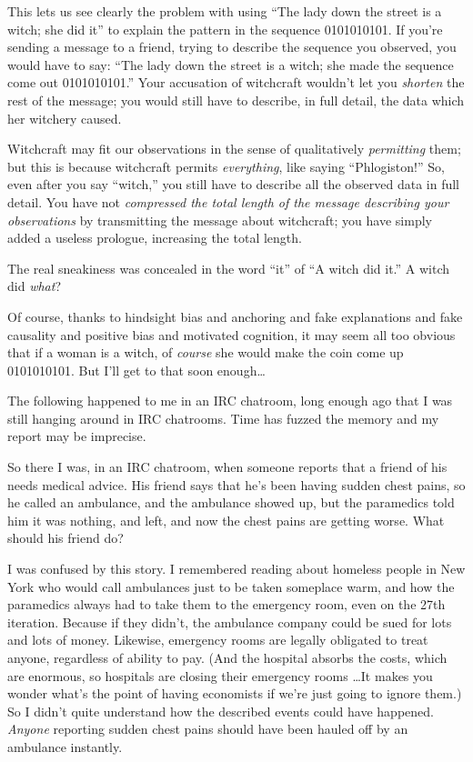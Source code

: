 {
 This lets us see clearly the problem with using
``The lady down the street is a witch; she did
it'' to explain the pattern in the sequence
0101010101. If you're sending a message to a friend,
trying to describe the sequence you observed, you would have to say:
``The lady down the street is a witch; she made the
sequence come out 0101010101.'' Your accusation of
witchcraft wouldn't let you \textit{shorten} the rest
of the message; you would still have to describe, in full detail, the
data which her witchery caused.}

{
 Witchcraft may fit our observations in the sense of qualitatively
\textit{permitting} them; but this is because witchcraft permits
\textit{everything}, like saying
``Phlogiston!'' So, even after you
say ``witch,'' you still have to
describe all the observed data in full detail. You have not
\textit{compressed the total length of the message describing your
observations} by transmitting the message about witchcraft; you have
simply added a useless prologue, increasing the total length.}

{
 The real sneakiness was concealed in the word
``it'' of ``A witch
did it.'' A witch did \textit{what}?}

{
 Of course, thanks to hindsight bias and anchoring and fake
explanations and fake causality and positive bias and motivated
cognition, it may seem all too obvious that if a woman is a witch, of
\textit{course} she would make the coin come up 0101010101. But
I'll get to that soon enough\ldots}

\myendsectiontext


{
 The following happened to me in an IRC chatroom, long enough ago
that I was still hanging around in IRC chatrooms. Time has fuzzed the
memory and my report may be imprecise. }

{
 So there I was, in an IRC chatroom, when someone reports that a
friend of his needs medical advice. His friend says that
he's been having sudden chest pains, so he called an
ambulance, and the ambulance showed up, but the paramedics told him it
was nothing, and left, and now the chest pains are getting worse. What
should his friend do?}

{
 I was confused by this story. I remembered reading about homeless
people in New York who would call ambulances just to be taken someplace
warm, and how the paramedics always had to take them to the emergency
room, even on the 27th iteration. Because if they
didn't, the ambulance company could be sued for lots
and lots of money. Likewise, emergency rooms are legally obligated to
treat anyone, regardless of ability to pay. (And the hospital absorbs
the costs, which are enormous, so hospitals are closing their emergency
rooms \ldots It makes you wonder what's the point of
having economists if we're just going to ignore them.)
So I didn't quite understand how the described events
could have happened. \textit{Anyone} reporting sudden chest pains
should have been hauled off by an ambulance instantly.}

